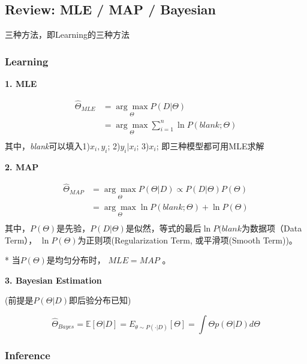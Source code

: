 \documentclass[UTF8]{ctexart}
\begin{document}
\dotfill

\subsection{Review: MLE / MAP / Bayesian}
三种方法，即Learning的三种方法
\subsubsection*{\textbf{Learning}} 

\textbf{1. MLE }


\begin{equation*}
    \begin{aligned}
        \hat \Theta_{MLE} &= \underset{\Theta}{\arg \max} P(D | \Theta)     \\
        &= \underset{\Theta}{\arg \max} \sum_{i=1}^n \ln P( \textit{blank} ; \Theta) \\
    \end{aligned}
\end{equation*}
其中，\textit{blank}可以填入1)$x_i, y_i$; 2)$y_i|x_i$; 3)$x_i$; 即三种模型都可用MLE求解

\textbf{2. MAP}

\begin{equation*}
    \begin{aligned}
        \hat \Theta_{MAP} &= \underset{\Theta}{\arg \max} P(\Theta | D)  \propto P(D|\Theta)P(\Theta)   \\
        &= \underset{\Theta}{\arg \max} \ln P( \textit{blank} ; \Theta) + \ln P(\Theta)\\
    \end{aligned}
\end{equation*}
其中，$P(\Theta)$是先验，$P(D|\Theta)$是似然，等式的最后$\ln P( \textit{blank} $为数据项（Data Term）， 
$\ln P(\Theta)$为正则项(Regularization Term, 或平滑项(Smooth Term))。

* 当$P(\Theta)$是均匀分布时， $MLE=MAP$ 。


\textbf{3. Bayesian Estimation}

(前提是$P(\Theta | D)$即后验分布已知)

\begin{equation*}
    \hat \Theta_{Bayes} = \mathbb{E}[\Theta | D ] = E_{\theta \sim P(\cdot | D)}[\Theta] = \int \Theta p(\Theta | D) d\Theta
\end{equation*}


\subsubsection*{\textbf{Inference}}
\end{document}
